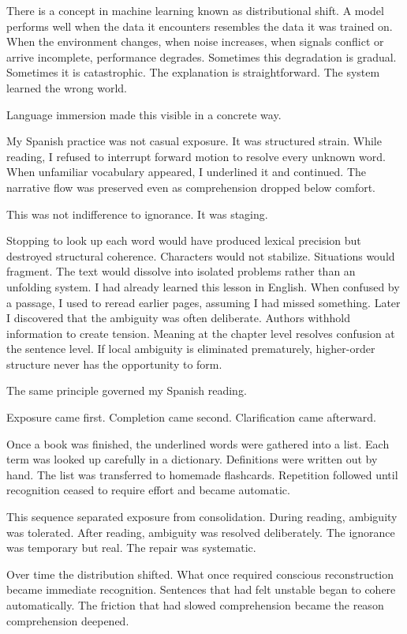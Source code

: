 \documentclass[12pt]{article}
\begin{document}
There is a concept in machine learning known as distributional shift. A model performs well when the data it encounters resembles the data it was trained on. When the environment changes, when noise increases, when signals conflict or arrive incomplete, performance degrades. Sometimes this degradation is gradual. Sometimes it is catastrophic. The explanation is straightforward. The system learned the wrong world.

Language immersion made this visible in a concrete way.

My Spanish practice was not casual exposure. It was structured strain. While reading, I refused to interrupt forward motion to resolve every unknown word. When unfamiliar vocabulary appeared, I underlined it and continued. The narrative flow was preserved even as comprehension dropped below comfort.

This was not indifference to ignorance. It was staging.

Stopping to look up each word would have produced lexical precision but destroyed structural coherence. Characters would not stabilize. Situations would fragment. The text would dissolve into isolated problems rather than an unfolding system. I had already learned this lesson in English. When confused by a passage, I used to reread earlier pages, assuming I had missed something. Later I discovered that the ambiguity was often deliberate. Authors withhold information to create tension. Meaning at the chapter level resolves confusion at the sentence level. If local ambiguity is eliminated prematurely, higher-order structure never has the opportunity to form.

The same principle governed my Spanish reading.

Exposure came first. Completion came second. Clarification came afterward.

Once a book was finished, the underlined words were gathered into a list. Each term was looked up carefully in a dictionary. Definitions were written out by hand. The list was transferred to homemade flashcards. Repetition followed until recognition ceased to require effort and became automatic.

This sequence separated exposure from consolidation. During reading, ambiguity was tolerated. After reading, ambiguity was resolved deliberately. The ignorance was temporary but real. The repair was systematic.

Over time the distribution shifted. What once required conscious reconstruction became immediate recognition. Sentences that had felt unstable began to cohere automatically. The friction that had slowed comprehension became the reason comprehension deepened.
\end{document}
